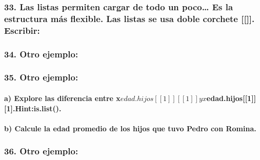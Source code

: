 \documentclass[
]{article}
\begin{document}
\hypertarget{las-listas-permiten-cargar-de-todo-un-poco-es-la-estructura-muxe1s-flexible.-las-listas-se-usa-doble-corchete-.-escribir}{%
\subsubsection{33. Las listas permiten cargar de todo un poco\ldots{} Es
la estructura más flexible. Las listas se usa doble corchete
{[}{[}{]}{]}.
Escribir:}\label{las-listas-permiten-cargar-de-todo-un-poco-es-la-estructura-muxe1s-flexible.-las-listas-se-usa-doble-corchete-.-escribir}}

\hypertarget{otro-ejemplo}{%
\subsubsection{34. Otro ejemplo:}\label{otro-ejemplo}}

\hypertarget{otro-ejemplo-1}{%
\subsubsection{35. Otro ejemplo:}\label{otro-ejemplo-1}}

\hypertarget{a-explore-las-diferencia-entre-xedad.hijos11yxedad.hijos11.hintis.list.}{%
\paragraph{\texorpdfstring{a) Explore las diferencia entre
x\(edad.hijos[[1]][[1]]yx\)edad.hijos{[}{[}1{]}{]}{[}1{]}.Hint:is.list().}{a) Explore las diferencia entre xedad.hijos{[}{[}1{]}{]}{[}{[}1{]}{]}yxedad.hijos{[}{[}1{]}{]}{[}1{]}.Hint:is.list().}}\label{a-explore-las-diferencia-entre-xedad.hijos11yxedad.hijos11.hintis.list.}}

\hypertarget{b-calcule-la-edad-promedio-de-los-hijos-que-tuvo-pedro-con-romina.}{%
\paragraph{b) Calcule la edad promedio de los hijos que tuvo Pedro con
Romina.}\label{b-calcule-la-edad-promedio-de-los-hijos-que-tuvo-pedro-con-romina.}}

\hypertarget{otro-ejemplo-2}{%
\subsubsection{36. Otro ejemplo:}\label{otro-ejemplo-2}}
\end{document}
